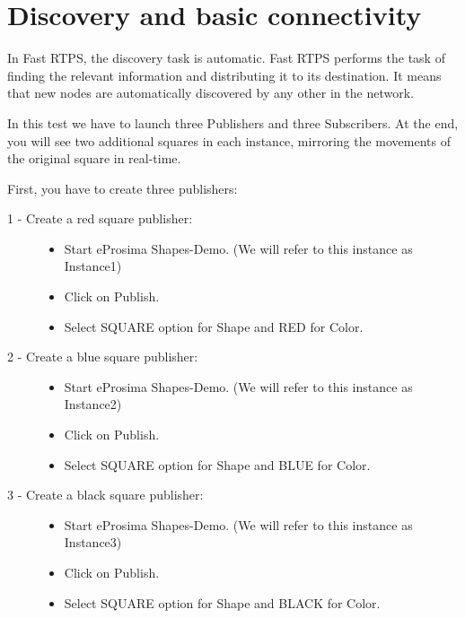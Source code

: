 \documentclass[letterpaper,10pt,english]{sphinxmanual}
\begin{document}
\chapter{Discovery and basic connectivity}
\label{\detokenize{discovery:discovery-and-basic-connectivity}}\label{\detokenize{discovery::doc}}
In Fast RTPS, the discovery task is automatic. Fast RTPS performs the task of finding the relevant information and distributing it to its destination. It means that new nodes are automatically discovered by any other in the network.

In this test we have to launch three Publishers and three Subscribers. At the end, you will see two additional squares in each instance, mirroring the movements of the original square in real-time.


First, you have to create three publishers:
\begin{description}
\item[{1 - Create a red square publisher:}] \leavevmode\begin{itemize}
\item {} 
Start eProsima Shapes-Demo. (We will refer to this instance as Instance1)

\item {} 
Click on Publish.

\item {} 
Select SQUARE option for Shape and RED for Color.

\end{itemize}

\item[{2 - Create a blue square publisher:}] \leavevmode\begin{itemize}
\item {} 
Start eProsima Shapes-Demo. (We will refer to this instance as Instance2)

\item {} 
Click on Publish.

\item {} 
Select SQUARE option for Shape and BLUE for Color.

\end{itemize}

\item[{3 - Create a black square publisher:}] \leavevmode\begin{itemize}
\item {} 
Start eProsima Shapes-Demo. (We will refer to this instance as Instance3)

\item {} 
Click on Publish.

\item {} 
Select SQUARE option for Shape and BLACK for Color.

\end{itemize}

\end{description}
\end{document}
